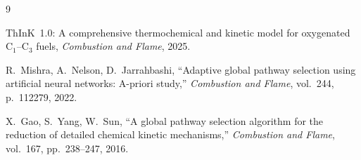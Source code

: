 \documentclass[11pt,a4paper]{article}
\begin{document}
\begin{thebibliography}{9}

ThInK~1.0: A comprehensive thermochemical and kinetic model for oxygenated C$_1$--C$_3$ fuels,
\emph{Combustion and Flame}, 2025.

R.~Mishra, A.~Nelson, D.~Jarrahbashi,
``Adaptive global pathway selection using artificial neural networks: A-priori study,''
\emph{Combustion and Flame}, vol.~244, p.~112279, 2022.

X.~Gao, S.~Yang, W.~Sun,
``A global pathway selection algorithm for the reduction of detailed chemical kinetic mechanisms,''
\emph{Combustion and Flame}, vol.~167, pp.~238--247, 2016.

\end{thebibliography}
\end{document}
